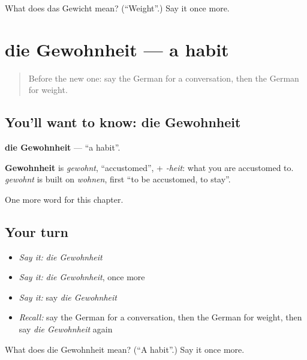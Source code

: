 \begin{tcolorbox}[breakable,colback=teal!4,colframe=teal!35!black,title={Before you move on}]
What does das Gewicht mean? (\textquotedblleft{}Weight\textquotedblright{}.) Say it once more.
\end{tcolorbox}
\section[die Gewohnheit]{die Gewohnheit — a habit}

\label{lesson:GE-C230-gewohnheit}



\begin{quote}
Before the new one: say the German for a conversation, then the German for weight.
\end{quote}

\subsection*{You'll want to know: die Gewohnheit}
\textbf{die Gewohnheit} — \textquotedblleft{}a habit\textquotedblright{}.

\begin{cousinweb}
\textbf{Gewohnheit} is \emph{gewohnt}, \textquotedblleft{}accustomed\textquotedblright{}, + \emph{-heit}: what you are accustomed to. \emph{gewohnt} is built on \emph{wohnen}, first \textquotedblleft{}to be accustomed, to stay\textquotedblright{}.
\end{cousinweb}

\begin{grammarlens}[title={What you've built}]
One more word for this chapter.
\end{grammarlens}

\subsection*{Your turn}
\begin{itemize}
\raggedright
  \item \emph{Say it:} \emph{die Gewohnheit}
  \item \emph{Say it:} \emph{die Gewohnheit}, once more
  \item \emph{Say it:} say \emph{die Gewohnheit}
  \item \emph{Recall:} say the German for a conversation, then the German for weight, then say \emph{die Gewohnheit} again
\end{itemize}

\begin{tcolorbox}[breakable,colback=teal!4,colframe=teal!35!black,title={Before you move on}]
What does die Gewohnheit mean? (\textquotedblleft{}A habit\textquotedblright{}.) Say it once more.
\end{tcolorbox}
